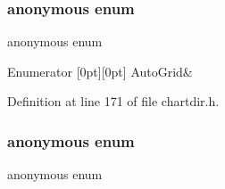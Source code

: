 \mbox{\label{namespace_chart_ae18eaef27769722572aa24f7750ee41e}} 
\subsubsection{\texorpdfstring{anonymous enum}{anonymous enum}}
{\footnotesize\ttfamily anonymous enum}

\begin{DoxyEnumFields}{Enumerator}
[0pt][0pt]{}\mbox{\label{namespace_chart_ae18eaef27769722572aa24f7750ee41eaf2820acb0bbdc63f3401414adb98a058}} 
Auto\+Grid&\\
\hline

\end{DoxyEnumFields}


Definition at line 171 of file chartdir.\+h.

\mbox{\label{namespace_chart_a5ae3d159f02ffed01fcc4e63793dea7d}} 
\subsubsection{\texorpdfstring{anonymous enum}{anonymous enum}}
{\footnotesize\ttfamily anonymous enum}

